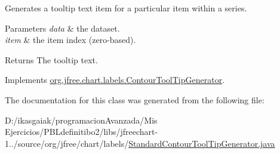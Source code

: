 Generates a tooltip text item for a particular item within a series.


\begin{DoxyParams}{Parameters}
{\em data} & the dataset. \\
\hline
{\em item} & the item index (zero-\/based).\\
\hline
\end{DoxyParams}
\begin{DoxyReturn}{Returns}
The tooltip text. 
\end{DoxyReturn}


Implements \mbox{\hyperlink{interfaceorg_1_1jfree_1_1chart_1_1labels_1_1_contour_tool_tip_generator_a667a729e1865dc84fccab2eff1ed0c9e}{org.\+jfree.\+chart.\+labels.\+Contour\+Tool\+Tip\+Generator}}.



The documentation for this class was generated from the following file\+:\begin{DoxyCompactItemize}
\item 
D\+:/ikasgaiak/programacion\+Avanzada/\+Mis Ejercicios/\+P\+B\+Ldefinitibo2/libs/jfreechart-\/1../source/org/jfree/chart/labels/\mbox{\hyperlink{_standard_contour_tool_tip_generator_8java}{Standard\+Contour\+Tool\+Tip\+Generator.\+java}}\end{DoxyCompactItemize}

